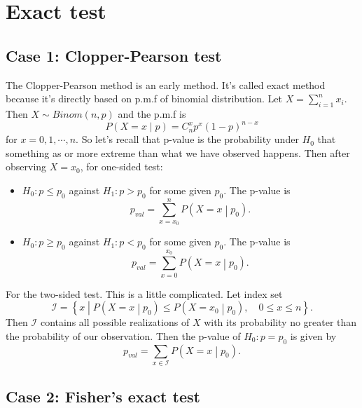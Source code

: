 \documentclass[a4paper,12pt]{article}
\begin{document}
\section{Exact test}
\label{sec:exact-test}

\subsection{Case 1: Clopper-Pearson test}
\label{sec:case-1:-clopper}

The Clopper-Pearson method is an early method. It's called exact method because it's directly based on p.m.f of binomial distribution. Let $X = \sum\limits_{i = 1}^nx_i$. Then $X\sim Binom(n, p)$ and the p.m.f is
\[
  P\left(X = x\middle|p\right) = C_n^xp^x\left(1 - p\right)^{n - x}
\]
for $x = 0, 1, \cdots, n$. So let's recall that p-value is the probability under $H_0$ that something as or more extreme than what we have observed happens. Then after observing $X = x_0$, for one-sided test:
\begin{itemize}
\item $H_0: p \leq p_0$ against $H_1: p > p_0$ for some given $p_0$. The p-value is
  \[
    p_{val} = \sum\limits_{x = x_0}^nP\left(X = x\middle|p_0\right)
    .
  \]
  
\item $H_0: p \geq p_0$ against $H_1: p < p_0$ for some given $p_0$. The p-value is
  \[
    p_{val} = \sum\limits_{x = 0}^{x_0}P\left(X = x\middle|p_0\right)
    .
  \]
\end{itemize}
For the two-sided test. This is a little complicated. Let index set
\[
  \mathcal{I} = \left\{
    x\middle|
    P\left(X = x\middle|p_0\right) \leq P\left(X = x_0\middle|p_0\right)
    ,\quad
    0\leq x \leq n
  \right\}
  .
\]
Then $\mathcal{I}$ contains all possible realizations of $X$ with its probability no greater than the probability of our observation. Then the p-value of $H_0: p = p_0$ is given by
\[
  p_{val} = \sum\limits_{x\in\mathcal{I}}P\left(X = x\middle|p_0\right)
  .
\]


\subsection{Case 2: Fisher's exact test}
\label{sec:case-2:-fishers}
\end{document}
